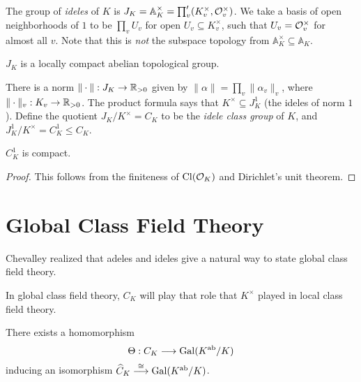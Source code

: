 \begin{definition}
  The group of \emph{ideles} of $K$ is
  $J_K = \mathbb{A}_K^\times = \prod_v' (K_v^\times, \mathcal{O}_v^\times)$.
  We take a basis of open neighborhoods
  of $1$ to be $\prod_v U_v$ for
  open $U_v \subseteq K_v^\times$, such that
  $U_v = \mathcal{O}_v^\times$ for almost all $v$. Note that this is \emph{not} the subspace topology
  from $\mathbb{A}_K^\times \subseteq \mathbb{A}_K$.
\end{definition}

\begin{theorem}
  $J_K$ is a locally compact abelian topological
  group.
\end{theorem}

\begin{definition}
  There is a norm $\| \cdot \| : J_K \to \mathbb{R}_{> 0}$
  given by
  $\|\alpha\| = \prod_v \|\alpha_v\|_v$,
  where $\|\cdot\|_v : K_v \to \mathbb{R}_{> 0}$. The
  product formula says that
  $K^\times \subseteq J_K^1$ (the ideles of
  norm $1$). Define the quotient
  $J_K / K^\times = C_K$ to be the \emph{idele class group} of $K$, and
  $J^1_K / K^\times = C_K^1 \le C_K$.
\end{definition}

\begin{theorem}
  $C_K^1$ is compact.
\end{theorem}

\begin{proof}
  This follows from the finiteness of
  $\operatorname{Cl}(\mathcal{O}_K)$ and Dirichlet's unit theorem.
\end{proof}

\section{Global Class Field Theory}

\begin{remark}
  Chevalley realized that adeles and ideles
  give a natural way to state global class
  field theory.
\end{remark}

\begin{remark}
  In global class field theory, $C_K$ will
  play that role that $K^\times$ played in
  local class field theory.
\end{remark}

\begin{theorem}[Artin]
  There exists a homomorphism
  \[
    \Theta : C_K \longrightarrow \operatorname{Gal}(K^\mathrm{ab} / K)
  \]
  inducing an isomorphism
  $\widehat{C}_K \overset{\cong}{\longrightarrow} \operatorname{Gal}(K^\mathrm{ab} / K)$.
\end{theorem}

